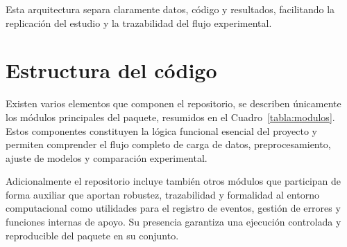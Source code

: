 \documentclass[12pt,a4paper]{report}
\begin{document}
Esta arquitectura separa claramente datos, código y resultados, facilitando la replicación del estudio y la trazabilidad del flujo experimental.

\section{Estructura del código}

Existen varios elementos que componen el repositorio, se describen únicamente los módulos principales del paquete, resumidos en el Cuadro~\ref{tabla:modulos}. Estos componentes constituyen la lógica funcional esencial del proyecto y permiten comprender el flujo completo de carga de datos, preprocesamiento, ajuste de modelos y comparación experimental.

Adicionalmente el repositorio incluye también otros módulos que participan de forma auxiliar que aportan robustez, trazabilidad y formalidad al entorno computacional como utilidades para el registro de eventos, gestión de errores y funciones internas de apoyo. Su presencia garantiza una ejecución controlada y reproducible del paquete en su conjunto.
\end{document}
